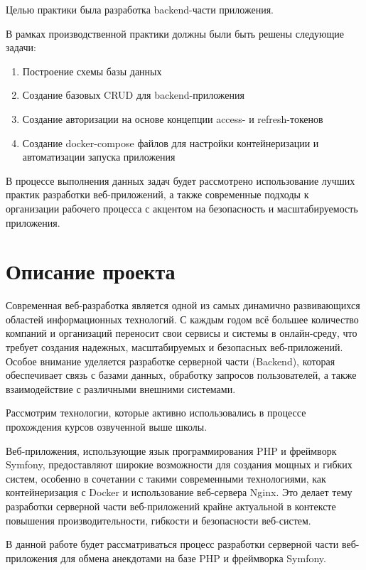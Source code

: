\documentclass[pract]{SCWorks}
\begin{document}
Целью практики была разработка backend-части приложения.

В рамках производственной практики должны были быть решены следующие задачи:
\begin{enumerate}
    \item Построение схемы базы данных
    \item Создание базовых CRUD для backend-приложения
    \item Создание авторизации на основе концепции access- и refresh-токенов
    \item Создание docker-compose файлов для настройки
    контейнеризации и автоматизации запуска приложения  
\end{enumerate}

В процессе выполнения данных задач будет рассмотрено использование
лучших практик разработки веб-приложений, а также современные подходы
к организации рабочего процесса с акцентом на безопасность и масштабируемость
приложения.

\section{Описание проекта}

Современная веб-разработка является одной из самых динамично развивающихся 
областей информационных технологий. С каждым годом всё большее количество
компаний и организаций переносит свои сервисы и системы в онлайн-среду,
что требует создания надежных, масштабируемых и безопасных веб-приложений.
Особое внимание уделяется разработке серверной части (Backend), 
которая обеспечивает связь с базами данных, обработку запросов 
пользователей, а также взаимодействие с различными внешними системами.

Рассмотрим технологии, которые активно использовались в процессе прохождения
курсов озвученной выше школы.

Веб-приложения, использующие язык программирования PHP и фреймворк 
Symfony, предоставляют широкие возможности для создания мощных и гибких
систем, особенно в сочетании с такими современными технологиями, как 
контейнеризация с Docker и использование веб-сервера Nginx. Это делает 
тему разработки серверной части веб-приложений крайне актуальной в 
контексте повышения производительности, гибкости и безопасности
веб-систем.

В данной работе будет рассматриваться процесс разработки серверной
части веб-приложения для обмена анекдотами на базе PHP и фреймворка 
Symfony. 
\end{document}
